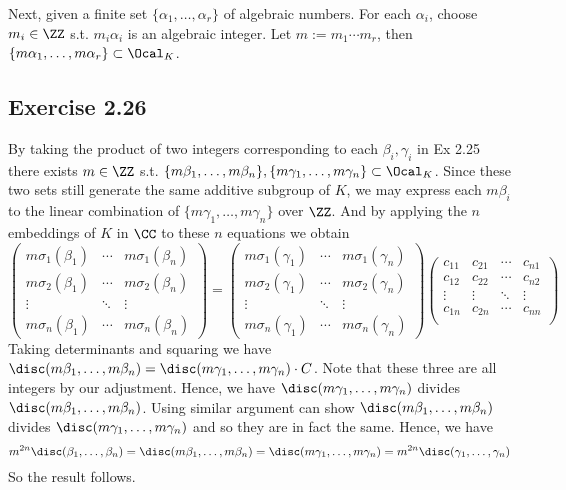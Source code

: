 \documentclass[../Chapter.tex]{subfiles}
\begin{document}
Next, given a finite set $\{\alpha_1,\ldots,\alpha_r\}$ of algebraic numbers. For each $\alpha_i$, choose $m_i\in \ZZ$ s.t. $m_i\alpha_i$ is an algebraic integer. Let $m:=m_1\cdots m_r$, then $\{m\alpha_1,\ldots,m\alpha_r\} \subset \Ocal_K$.

\subsection*{Exercise 2.26}

By taking the product of two integers corresponding to each $\beta_i,\gamma_i$ in Ex 2.25 there exists $m\in\ZZ$ s.t. $\{m\beta_1,\ldots,m\beta_n\},\{m\gamma_1,\ldots,m\gamma_n\}\subset\Ocal_K$. Since these two sets still generate the same additive subgroup of $K$, we may express each $m\beta_i$ to the linear combination of $\{m\gamma_1,\ldots,m\gamma_n\}$ over $\ZZ$. And by applying the $n$ embeddings of $K$ in $\CC$ to these $n$ equations we obtain
$$\begin{pmatrix}
m\sigma_1(\beta_1)  &  \cdots & m\sigma_1(\beta_n)  \\
m\sigma_2(\beta_1) &  \cdots & m\sigma_2(\beta_n)  \\
\vdots                         &  \ddots & \vdots  \\
m\sigma_n(\beta_1) &  \cdots & m\sigma_n(\beta_n)
\end{pmatrix}=
\begin{pmatrix}
m\sigma_1(\gamma_1)  &  \cdots & m\sigma_1(\gamma_n)  \\
m\sigma_2(\gamma_1) &  \cdots & m\sigma_2(\gamma_n)  \\
\vdots                         &  \ddots & \vdots  \\
m\sigma_n(\gamma_1) &  \cdots & m\sigma_n(\gamma_n)
\end{pmatrix}
\begin{pmatrix}
c_{11}  & c_{21} & \cdots & c_{n1} \\
c_{12} & c_{22} & \cdots & c_{n2} \\
\vdots & \vdots  & \ddots & \vdots \\
c_{1n} & c_{2n} & \cdots & c_{nn} \\
\end{pmatrix}
$$
Taking determinants and squaring we have $\disc(m\beta_1,\ldots,m\beta_n)=\disc(m\gamma_1,\ldots,m\gamma_n)\cdot C$. Note that these three are all integers by our adjustment. Hence, we have $\disc(m\gamma_1,\ldots,m\gamma_n)$ divides $\disc(m\beta_1,\ldots,m\beta_n)$. Using similar argument can show $\disc(m\beta_1,\ldots,m\beta_n)$ divides $\disc(m\gamma_1,\ldots,m\gamma_n)$ and so they are in fact the same. Hence, we have $$m^{2n}\disc(\beta_1,\ldots,\beta_n)=\disc(m\beta_1,\ldots,m\beta_n)=\disc(m\gamma_1,\ldots,m\gamma_n)=m^{2n}\disc(\gamma_1,\ldots,\gamma_n)$$ So the result follows.
\end{document}
